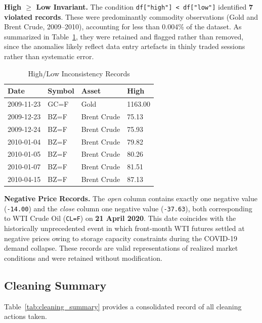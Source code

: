 \documentclass[10pt,a4paper,twocolumn]{article}
\begin{document}
\textbf{High $\geq$ Low Invariant.} The condition \texttt{df["high"] < df["low"]} identified \textbf{7 violated records}. These were predominantly commodity observations (Gold and Brent Crude, 2009--2010), accounting for less than 0.004\% of the dataset. As summarized in Table~\ref{tab:anomalies}, they were retained and flagged rather than removed, since the anomalies likely reflect data entry artefacts in thinly traded sessions rather than systematic error.

\begin{table}[H]
\centering
\caption{High/Low Inconsistency Records}
\label{tab:anomalies}
\small
\begin{tabular}{@{}llll@{}}
\toprule
\textbf{Date} & \textbf{Symbol} & \textbf{Asset} & \textbf{High} \\
\midrule
2009-11-23 & GC=F & Gold        & 1163.00 \\
2009-12-23 & BZ=F & Brent Crude & 75.13 \\
2009-12-24 & BZ=F & Brent Crude & 75.93 \\
2010-01-04 & BZ=F & Brent Crude & 79.82 \\
2010-01-05 & BZ=F & Brent Crude & 80.26 \\
2010-01-07 & BZ=F & Brent Crude & 81.51 \\
2010-04-15 & BZ=F & Brent Crude & 87.13 \\
\bottomrule
\end{tabular}
\end{table}

\textbf{Negative Price Records.} The \textit{open} column contains exactly one negative value (\texttt{-14.00}) and the \textit{close} column one negative value (\texttt{-37.63}), both corresponding to WTI Crude Oil (\texttt{CL=F}) on \textbf{21 April 2020}. This date coincides with the historically unprecedented event in which front-month WTI futures settled at negative prices owing to storage capacity constraints during the COVID-19 demand collapse. These records are valid representations of realized market conditions and were retained without modification.

\subsection{Cleaning Summary}

Table~\ref{tab:cleaning_summary} provides a consolidated record of all cleaning actions taken.
\end{document}
